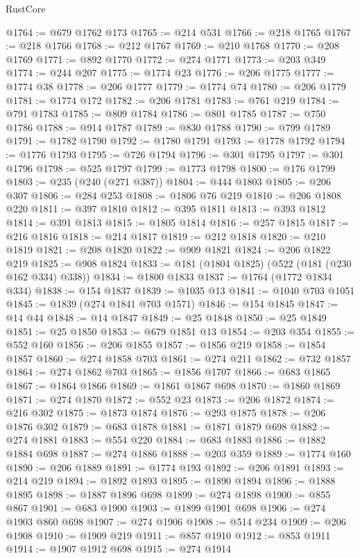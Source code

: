 \begin{lexlean}{RustCore}
\begin{coremodule}
@1764 := @679 @1762 @173
@1765 := @214 @531
@1766 := @218 @1765
@1767 := @218 @1766
@1768 := @212 @1767
@1769 := @210 @1768
@1770 := @208 @1769
@1771 := @892 @1770
@1772 := @274 @1771
@1773 := @203 @349
@1774 := @244 @207
@1775 := @1774 @23
@1776 := @206 @1775
@1777 := @1774 @38
@1778 := @206 @1777
@1779 := @1774 @74
@1780 := @206 @1779
@1781 := @1774 @172
@1782 := @206 @1781
@1783 := @761 @219
@1784 := @791 @1783
@1785 := @809 @1784
@1786 := @801 @1785
@1787 := @750 @1786
@1788 := @914 @1787
@1789 := @830 @1788
@1790 := @799 @1789
@1791 := @1782 @1790
@1792 := @1780 @1791
@1793 := @1778 @1792
@1794 := @1776 @1793
@1795 := @726 @1794
@1796 := @301 @1795
@1797 := @301 @1796
@1798 := @525 @1797
@1799 := @1773 @1798
@1800 := @176 @1799
@1803 := @235 (@240 (@271 @387))
@1804 := @444 @1803
@1805 := @206 @307
@1806 := @284 @253
@1808 := @1806 @76 @219
@1810 := @206 @1808 @220
@1811 := @397 @1810
@1812 := @395 @1811
@1813 := @393 @1812
@1814 := @391 @1813
@1815 := @1805 @1814
@1816 := @257 @1815
@1817 := @216 @1816
@1818 := @214 @1817
@1819 := @212 @1818
@1820 := @210 @1819
@1821 := @208 @1820
@1822 := @909 @1821
@1824 := @206 @1822 @219
@1825 := @908 @1824
@1833 := @181 (@1804 @1825) (@522 (@181 (@230 @162 @334) @338))
@1834 := @1800 @1833
@1837 := @1764 (@1772 @1834 @334)
@1838 := @154 @1837
@1839 := @1035 @13
@1841 := @1040 @703 @1051
@1845 := @1839 (@274 @1841 @703 @1571)
@1846 := @154 @1845
@1847 := @14 @44
@1848 := @14 @1847
@1849 := @25 @1848
@1850 := @25 @1849
@1851 := @25 @1850
@1853 := @679 @1851 @13
@1854 := @203 @354
@1855 := @552 @160
@1856 := @206 @1855
@1857 := @1856 @219
@1858 := @1854 @1857
@1860 := @274 @1858 @703
@1861 := @274 @211
@1862 := @732 @1857
@1864 := @274 @1862 @703
@1865 := @1856 @1707
@1866 := @683 @1865
@1867 := @1864 @1866
@1869 := @1861 @1867 @698
@1870 := @1860 @1869
@1871 := @274 @1870
@1872 := @552 @23
@1873 := @206 @1872
@1874 := @216 @302
@1875 := @1873 @1874
@1876 := @293 @1875
@1878 := @206 @1876 @302
@1879 := @683 @1878
@1881 := @1871 @1879 @698
@1882 := @274 @1881
@1883 := @554 @220
@1884 := @683 @1883
@1886 := @1882 @1884 @698
@1887 := @274 @1886
@1888 := @203 @359
@1889 := @1774 @160
@1890 := @206 @1889
@1891 := @1774 @193
@1892 := @206 @1891
@1893 := @214 @219
@1894 := @1892 @1893
@1895 := @1890 @1894
@1896 := @1888 @1895
@1898 := @1887 @1896 @698
@1899 := @274 @1898
@1900 := @855 @867
@1901 := @683 @1900
@1903 := @1899 @1901 @698
@1906 := @274 @1903 @860 @698
@1907 := @274 @1906
@1908 := @514 @234
@1909 := @206 @1908
@1910 := @1909 @219
@1911 := @857 @1910
@1912 := @853 @1911
@1914 := @1907 @1912 @698
@1915 := @274 @1914

\end{coremodule}
\end{lexlean}
